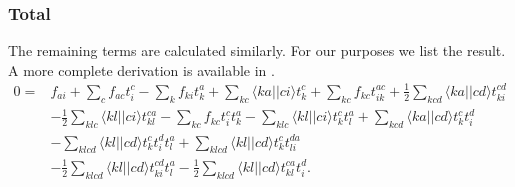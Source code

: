 \documentclass[a4paper,norsk,11pt,twoside]{report}
\begin{document}
\subsubsection{Total}
The remaining terms are calculated similarly. For our purposes we list
the result. A more complete derivation is available in
\cite{non_refer_numba1}.
\begin{align}
0 = & f_{ai} + \sum_c f_{ac} t_i^c - \sum_k f_{ki} t_k^a + \sum_{kc} \langle ka||ci \rangle t_k^c + \sum_{kc} f_{kc} t_{ik}^{ac} + \frac{1}{2} \sum_{kcd} \langle ka || cd \rangle t_{ki}^{cd} \label{T1equation} \\ &
- \frac{1}{2} \sum_{klc} \langle kl||ci\rangle t_{kl}^{ca} - \sum_{kc} f_{kc} t_i^c t_k^a - \sum_{klc} \langle kl || ci \rangle t_k^c t_l^a + \sum_{kcd} \langle ka||cd \rangle t_k^c t_i^d \nonumber \\ & 
- \sum_{klcd} \langle kl || cd \rangle t_k^c t_i^d t_l^a + \sum_{klcd} \langle kl||cd\rangle t_k^c t_{li}^{da} \nonumber \\ &
 - \frac{1}{2} \sum_{klcd} \langle kl || cd \rangle t_{ki}^{cd} t_l^a 
- \frac{1}{2} \sum_{klcd} \langle kl||cd \rangle t_{kl}^{ca} t_i^d . \nonumber
\end{align}
\end{document}

